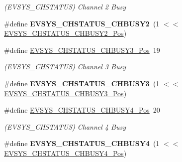 \begin{DoxyCompactItemize}
\begin{DoxyCompactList}\small\item\em (E\+V\+S\+Y\+S\+\_\+\+C\+H\+S\+T\+A\+T\+U\+S) Channel 2 Busy \end{DoxyCompactList}\item 
\hypertarget{group___s_a_m_l21___e_v_s_y_s_ga769229e78c6ed587ba0b6a7ddf3c922d}{}\#define {\bfseries E\+V\+S\+Y\+S\+\_\+\+C\+H\+S\+T\+A\+T\+U\+S\+\_\+\+C\+H\+B\+U\+S\+Y2}~(1 $<$$<$ \hyperlink{group___s_a_m_l21___e_v_s_y_s_gaf6e013b29b4cdd509eeac812ddaac8db}{E\+V\+S\+Y\+S\+\_\+\+C\+H\+S\+T\+A\+T\+U\+S\+\_\+\+C\+H\+B\+U\+S\+Y2\+\_\+\+Pos})\label{group___s_a_m_l21___e_v_s_y_s_ga769229e78c6ed587ba0b6a7ddf3c922d}

\item 
\hypertarget{group___s_a_m_l21___e_v_s_y_s_ga935d35297be2faecffa88d2576652a6a}{}\#define \hyperlink{group___s_a_m_l21___e_v_s_y_s_ga935d35297be2faecffa88d2576652a6a}{E\+V\+S\+Y\+S\+\_\+\+C\+H\+S\+T\+A\+T\+U\+S\+\_\+\+C\+H\+B\+U\+S\+Y3\+\_\+\+Pos}~19\label{group___s_a_m_l21___e_v_s_y_s_ga935d35297be2faecffa88d2576652a6a}

\begin{DoxyCompactList}\small\item\em (E\+V\+S\+Y\+S\+\_\+\+C\+H\+S\+T\+A\+T\+U\+S) Channel 3 Busy \end{DoxyCompactList}\item 
\hypertarget{group___s_a_m_l21___e_v_s_y_s_ga7a293341b35e6f0cb93bcdc65b3bea66}{}\#define {\bfseries E\+V\+S\+Y\+S\+\_\+\+C\+H\+S\+T\+A\+T\+U\+S\+\_\+\+C\+H\+B\+U\+S\+Y3}~(1 $<$$<$ \hyperlink{group___s_a_m_l21___e_v_s_y_s_ga935d35297be2faecffa88d2576652a6a}{E\+V\+S\+Y\+S\+\_\+\+C\+H\+S\+T\+A\+T\+U\+S\+\_\+\+C\+H\+B\+U\+S\+Y3\+\_\+\+Pos})\label{group___s_a_m_l21___e_v_s_y_s_ga7a293341b35e6f0cb93bcdc65b3bea66}

\item 
\hypertarget{group___s_a_m_l21___e_v_s_y_s_gac2c4d066bdf632191169cd4bf2e3b8b5}{}\#define \hyperlink{group___s_a_m_l21___e_v_s_y_s_gac2c4d066bdf632191169cd4bf2e3b8b5}{E\+V\+S\+Y\+S\+\_\+\+C\+H\+S\+T\+A\+T\+U\+S\+\_\+\+C\+H\+B\+U\+S\+Y4\+\_\+\+Pos}~20\label{group___s_a_m_l21___e_v_s_y_s_gac2c4d066bdf632191169cd4bf2e3b8b5}

\begin{DoxyCompactList}\small\item\em (E\+V\+S\+Y\+S\+\_\+\+C\+H\+S\+T\+A\+T\+U\+S) Channel 4 Busy \end{DoxyCompactList}\item 
\hypertarget{group___s_a_m_l21___e_v_s_y_s_gaa87367f1fc5e4868fefc5c6dc1020aeb}{}\#define {\bfseries E\+V\+S\+Y\+S\+\_\+\+C\+H\+S\+T\+A\+T\+U\+S\+\_\+\+C\+H\+B\+U\+S\+Y4}~(1 $<$$<$ \hyperlink{group___s_a_m_l21___e_v_s_y_s_gac2c4d066bdf632191169cd4bf2e3b8b5}{E\+V\+S\+Y\+S\+\_\+\+C\+H\+S\+T\+A\+T\+U\+S\+\_\+\+C\+H\+B\+U\+S\+Y4\+\_\+\+Pos})\label{group___s_a_m_l21___e_v_s_y_s_gaa87367f1fc5e4868fefc5c6dc1020aeb}


\end{DoxyCompactItemize}
